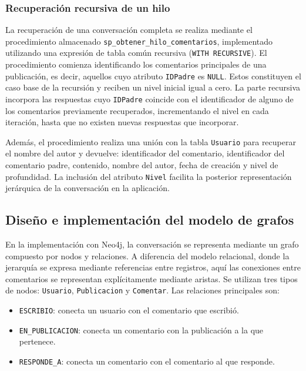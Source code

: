 \documentclass[11pt, a4paper]{article}
\begin{document}
\subsubsection{Recuperación recursiva de un hilo}
La recuperación de una conversación completa se realiza mediante el procedimiento almacenado \texttt{sp\_obtener\_hilo\_comentarios}, implementado utilizando una expresión de tabla común recursiva (\texttt{WITH RECURSIVE}). El procedimiento comienza identificando los comentarios principales de una publicación, es decir, aquellos cuyo atributo \texttt{IDPadre} es \texttt{NULL}. Estos constituyen el caso base de la recursión y reciben un nivel inicial igual a cero. La parte recursiva incorpora las respuestas cuyo \texttt{IDPadre} coincide con el identificador de alguno de los comentarios previamente recuperados, incrementando el nivel en cada iteración, hasta que no existen nuevas respuestas que incorporar.

Además, el procedimiento realiza una unión con la tabla \texttt{Usuario} para recuperar el nombre del autor y devuelve: identificador del comentario, identificador del comentario padre, contenido, nombre del autor, fecha de creación y nivel de profundidad. La inclusión del atributo \texttt{Nivel} facilita la posterior representación jerárquica de la conversación en la aplicación.

\subsection{Diseño e implementación del modelo de grafos}
En la implementación con Neo4j, la conversación se representa mediante un grafo compuesto por nodos y relaciones. A diferencia del modelo relacional, donde la jerarquía se expresa mediante referencias entre registros, aquí las conexiones entre comentarios se representan explícitamente mediante aristas. Se utilizan tres tipos de nodos: \texttt{Usuario}, \texttt{Publicacion} y \texttt{Comentar}. Las relaciones principales son:

\begin{itemize}[leftmargin=1.5em]
    \item \texttt{ESCRIBIO}: conecta un usuario con el comentario que escribió.
    \item \texttt{EN\_PUBLICACION}: conecta un comentario con la publicación a la que pertenece.
    \item \texttt{RESPONDE\_A}: conecta un comentario con el comentario al que responde.
\end{itemize}
\end{document}
